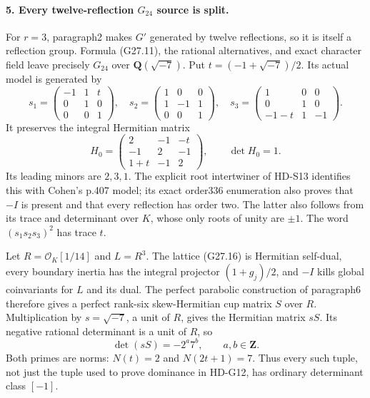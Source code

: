 \paragraph{5. Every twelve-reflection \(G_{24}\) source is split.}
For \(r=3\), paragraph2 makes \(G'\) generated by twelve
reflections, so it is itself a reflection group. Formula
(G27.11), the rational alternatives, and exact character
field leave precisely \(G_{24}\) over \(\mathbf Q(\sqrt{-7})\).
Put \(t=(-1+\sqrt{-7})/2\). Its actual model is generated by
\[
 s_1=\begin{pmatrix}-1&1&t\\0&1&0\\0&0&1\end{pmatrix},\quad
 s_2=\begin{pmatrix}1&0&0\\1&-1&1\\0&0&1\end{pmatrix},\quad
 s_3=\begin{pmatrix}1&0&0\\0&1&0\\-1-t&1&-1\end{pmatrix}.
                                                               \tag{G27.15}
\]
It preserves the integral Hermitian matrix
\[
 H_0=\begin{pmatrix}2&-1&-t\\-1&2&-1\\1+t&-1&2\end{pmatrix},
                 \qquad \det H_0=1.                         \tag{G27.16}
\]
Its leading minors are \(2,3,1\).
The explicit root intertwiner of HD-S13 identifies this
with Cohen's p.407 model; its exact order336 enumeration
also proves that \(-I\) is present and that every reflection
has order two. The latter also follows from its trace and
determinant over \(K\), whose only roots of unity are \(\pm1\).
The word \((s_1s_2s_3)^2\) has trace \(t\).

Let \(R=\mathcal O_K[1/14]\) and \(L=R^3\).
The lattice (G27.16) is Hermitian self-dual, every boundary
inertia has the integral projector \((1+g_j)/2\), and
\(-I\) kills global coinvariants for \(L\) and its dual.
The perfect parabolic construction of paragraph6 therefore
gives a perfect rank-six skew-Hermitian cup matrix \(S\)
over \(R\). Multiplication by \(s=\sqrt{-7}\), a unit of
\(R\), gives the Hermitian matrix \(sS\).
Its negative rational determinant is a unit of \(R\), so
\[
                  \det(sS)=-2^a7^b,\qquad a,b\in\mathbf Z.
                                                               \tag{G27.17}
\]
Both primes are norms:
\(N(t)=2\) and \(N(2t+1)=7\).
Thus every such tuple, not just the tuple used to prove
dominance in HD-G12, has ordinary determinant class \([-1]\).

